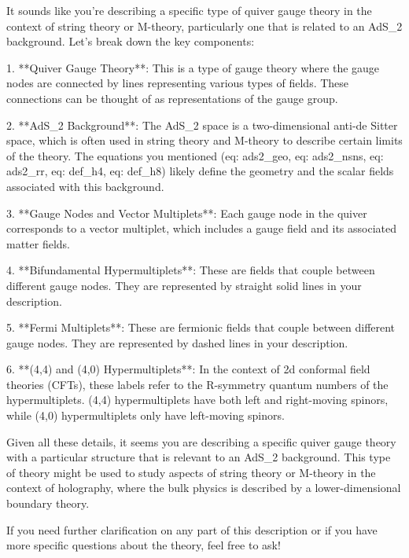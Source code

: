 It sounds like you're describing a specific type of quiver gauge theory in the context of string theory or M-theory, particularly one that is related to an AdS_2 background. Let's break down the key components:

1. **Quiver Gauge Theory**: This is a type of gauge theory where the gauge nodes are connected by lines representing various types of fields. These connections can be thought of as representations of the gauge group.

2. **AdS_2 Background**: The AdS_2 space is a two-dimensional anti-de Sitter space, which is often used in string theory and M-theory to describe certain limits of the theory. The equations you mentioned (eq: ads2_geo, eq: ads2_nsns, eq: ads2_rr, eq: def_h4, eq: def_h8) likely define the geometry and the scalar fields associated with this background.

3. **Gauge Nodes and Vector Multiplets**: Each gauge node in the quiver corresponds to a vector multiplet, which includes a gauge field and its associated matter fields.

4. **Bifundamental Hypermultiplets**: These are fields that couple between different gauge nodes. They are represented by straight solid lines in your description.

5. **Fermi Multiplets**: These are fermionic fields that couple between different gauge nodes. They are represented by dashed lines in your description.

6. **(4,4) and (4,0) Hypermultiplets**: In the context of 2d conformal field theories (CFTs), these labels refer to the R-symmetry quantum numbers of the hypermultiplets. (4,4) hypermultiplets have both left and right-moving spinors, while (4,0) hypermultiplets only have left-moving spinors.

Given all these details, it seems you are describing a specific quiver gauge theory with a particular structure that is relevant to an AdS_2 background. This type of theory might be used to study aspects of string theory or M-theory in the context of holography, where the bulk physics is described by a lower-dimensional boundary theory.

If you need further clarification on any part of this description or if you have more specific questions about the theory, feel free to ask!